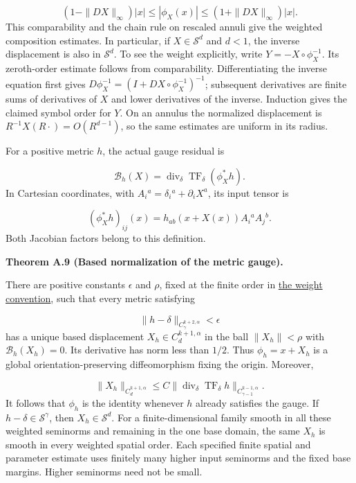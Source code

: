 \documentclass[
  english,
  11pt,
  reqno]{amsart}
\makeatletter
\newcommand{\pandocstatementheading}[1]{%
  \par\addpenalty{\@beginparpenalty}%
  \addvspace{.5\baselineskip plus .2\baselineskip minus .2\baselineskip}%
  {\normalfont\bfseries #1\par}%
  \nobreak\@afterindenttrue\@afterheading
}
\makeatother
\begin{document}
\label{eq:online-gauge-radius-comparability} \[
(1-\|DX\|_\infty)|x|
\le|\phi_X(x)|
\le(1+\|DX\|_\infty)|x|.
\] This comparability and the chain rule on rescaled annuli give the
weighted composition estimates. In particular, if \(X\in\mathscr S^d\)
and \(d<1\), the inverse displacement is also in \(\mathscr S^d\). To
see the weight explicitly, write \(Y=-X\circ\phi_X^{-1}\). Its
zeroth-order estimate follows from comparability. Differentiating the
inverse equation first gives
\(D\phi_X^{-1}=(I+DX\circ\phi_X^{-1})^{-1}\); subsequent derivatives are
finite sums of derivatives of \(X\) and lower derivatives of the
inverse. Induction gives the claimed symbol order for \(Y\). On an
annulus the normalized displacement is \(R^{-1}X(R\cdot)=O(R^{d-1})\),
so the same estimates are uniform in its radius.

For a positive metric \(h\), the actual gauge residual is

\label{eq:online-gauge-residual} \[
\mathcal B_h(X)
=\operatorname{div}_\delta\operatorname{TF}_\delta(\phi_X^*h).
\] In Cartesian coordinates, with
\(A_i{}^a=\delta_i{}^a+\partial_iX^a\), its input tensor is

\label{eq:online-gauge-actual-pullback} \[
(\phi_X^*h)_{ij}(x)
=h_{ab}(x+X(x))A_i{}^aA_j{}^b.
\] Both Jacobian factors belong to this definition.

\pandocstatementheading{\leavevmode{}\label{thm:online-gauge-based-normalization}Theorem A.9 (Based normalization of the metric gauge).}

There are positive constants \(\epsilon\) and \(\rho\), fixed at the
finite order in \hyperref[eq:online-gauge-fixed-weights]{the weight
convention}, such that every metric satisfying

\label{eq:online-gauge-base-metric-domain} \[
\|h-\delta\|_{C^{k+2,\alpha}_\gamma}<\epsilon
\] has a unique based displacement \(X_h\in C^{k+1,\alpha}_d\) in the
ball \(\|X_h\|<\rho\) with \(\mathcal B_h(X_h)=0\). Its derivative has
norm less than \(1/2\). Thus \(\phi_h=x+X_h\) is a global
orientation-preserving diffeomorphism fixing the origin. Moreover,

\label{eq:online-gauge-residual-displacement-bound} \[
\|X_h\|_{C^{k+1,\alpha}_d}
\le C\|\operatorname{div}_\delta\operatorname{TF}_\delta h
       \|_{C^{k-1,\alpha}_{\gamma-1}}.
\] It follows that \(\phi_h\) is the identity whenever \(h\) already
satisfies the gauge. If \(h-\delta\in\mathscr S^\gamma\), then
\(X_h\in\mathscr S^d\). For a finite-dimensional family smooth in all
these weighted seminorms and remaining in the one base domain, the same
\(X_h\) is smooth in every weighted spatial order. Each specified finite
spatial and parameter estimate uses finitely many higher input seminorms
and the fixed base margins. Higher seminorms need not be small.
\end{document}
